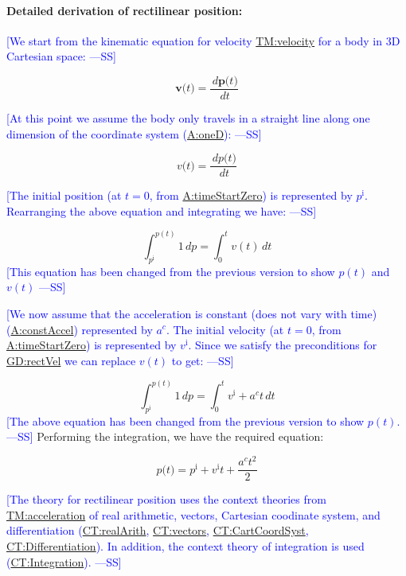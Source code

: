 \documentclass[12pt]{article}
\newcommand{\authornote}[3]{\textcolor{#1}{[#3 ---#2]}}
\newcommand{\authornote}[3]{}
\newcommand{\wss}[1]{\authornote{blue}{SS}{#1}}
\begin{document}
\paragraph{Detailed derivation of rectilinear position:}
\label{GD:rectPosDeriv}
\wss{We start from the kinematic equation for velocity
\hyperref[TM:velocity]{TM:velocity} for a body in 3D Cartesian space:}

$$\symbf{v}\text{(}t\text{)}=\frac{\,d\symbf{p}\text{(}t\text{)}}{\,dt}$$

\wss{At this point we assume the body only travels in a straight line along one
dimension of the coordinate system (\hyperref[oneD]{A:oneD}):}

$${v}\text{(}t\text{)}=\frac{\,d{p}\text{(}t\text{)}}{\,dt}$$

\wss{The initial position (at $t=0$, from
\hyperref[timeStartZero]{A:timeStartZero}) is represented by ${p^{\text{i}}}$.
Rearranging the above equation and integrating we have:}

\begin{displaymath}
\int_{{p^{\text{i}}}}^{p(t)}{1}\,dp=\int_{0}^{t}{v(t)}\,dt
\end{displaymath}
\wss{This equation has been changed from the previous version to show $p(t)$ and
$v(t)$}

\wss{We now assume that the acceleration is constant (does not vary with time)
(\hyperref[constAccel]{A:constAccel}) represented by ${a^{c}}$. The initial
velocity (at $t=0$, from \hyperref[timeStartZero]{A:timeStartZero}) is
represented by ${v^{\text{i}}}$. Since we satisfy the preconditions for
\hyperref[GD:rectVel]{GD:rectVel} we can replace $v(t)$ to get:}

\begin{displaymath}
\int_{{p^{\text{i}}}}^{p(t)}{1}\,dp=\int_{0}^{t}{{v^{\text{i}}}+{a^{c}} t}\,dt
\end{displaymath}
\wss{The above equation has been changed from the previous version to show
$p(t)$.}
Performing the integration, we have the required equation:

\begin{displaymath}
p\text{(}t\text{)}={p^{\text{i}}}+{v^{\text{i}}} t+\frac{{a^{c}} t^{2}}{2}
\end{displaymath}

\wss{The theory for rectilinear position uses the context theories from
\hyperref[TM:acceleration]{TM:acceleration} of real arithmetic, vectors,
Cartesian coodinate system, and differentiation
(\hyperref[CT:realArith]{CT:realArith}, \hyperref[CT:vectors]{CT:vectors},
\hyperref[CT:CartCoordSyst]{CT:CartCoordSyst},
\hyperref[CT:Differentiation]{CT:Differentiation}).  In addition, the context
theory of integration is used (\hyperref[CT:Integration]{CT:Integration}).}
~\\
\end{document}
